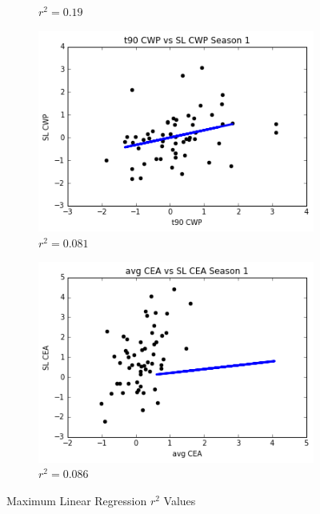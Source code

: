 \documentclass[12pt]{report}
\begin{document}
\begin{figure}[htbp]
\begin{subfigure}{.5\textwidth}
\caption{$r^2 = 0.19$}
\label{fig:LinearMaxT10}
\end{subfigure}%
\begin{subfigure}{.5\textwidth}
\centering
\includegraphics[scale = .6]{graphs/T90LinearMaxS1CWP0081.png}
\caption{$r^2 = 0.081$}
\label{fig:LinearMaxT90}
\end{subfigure}
\begin{subfigure}{.5\textwidth}
\centering
\includegraphics[scale = .6]{graphs/AVGLinearMaxS1CEA0086.png}
\caption{$r^2 = 0.086$}
\label{fig:LinearMaxAVG}
\end{subfigure}
\caption{\label{fig:maxLinear}Maximum Linear Regression $r^2$ Values}
\end{figure}
\end{document}

